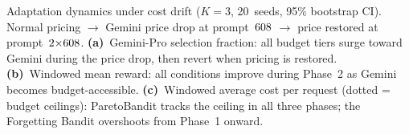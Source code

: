 Adaptation dynamics under cost drift ($K{=}3$, 20~seeds, 95\% bootstrap CI). Normal pricing $\to$ Gemini price drop at prompt~$608$ $\to$ price restored at prompt~$2{\times}608$. \textbf{(a)}~Gemini-Pro selection fraction: all budget tiers surge toward Gemini during the price drop, then revert when pricing is restored. \textbf{(b)}~Windowed mean reward: all conditions improve during Phase~2 as Gemini becomes budget-accessible. \textbf{(c)}~Windowed average cost per request (dotted = budget ceilings): ParetoBandit tracks the ceiling in all three phases; the Forgetting Bandit overshoots from Phase~1 onward.
